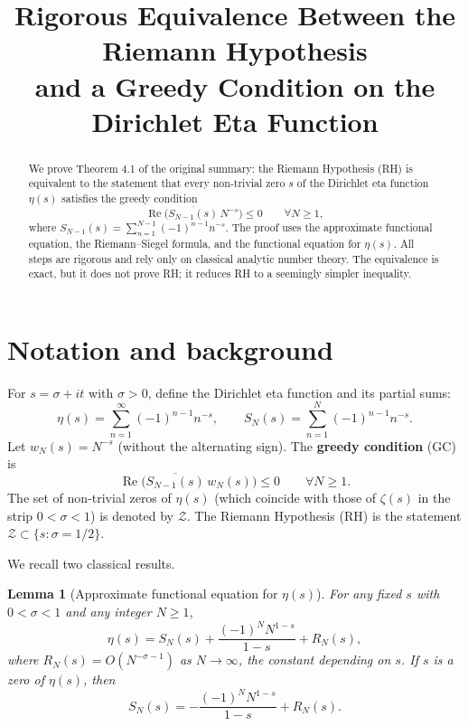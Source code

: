 \documentclass[12pt,a4paper]{article}
\title{Rigorous Equivalence Between the Riemann Hypothesis\\ and a Greedy Condition on the Dirichlet Eta Function}
\author{}
\date{}
\newtheorem{lemma}[theorem]{Lemma}
\begin{document}
\maketitle

\begin{abstract}
We prove Theorem 4.1 of the original summary: the Riemann Hypothesis (RH) is equivalent to the statement that every non‑trivial zero \(s\) of the Dirichlet eta function \(\eta(s)\) satisfies the greedy condition
\[
\operatorname{Re}\bigl(\overline{S_{N-1}(s)}\, N^{-s}\bigr)\le 0\qquad\forall N\ge 1,
\]
where \(S_{N-1}(s)=\sum_{n=1}^{N-1}(-1)^{n-1}n^{-s}\). The proof uses the approximate functional equation, the Riemann–Siegel formula, and the functional equation for \(\eta(s)\). All steps are rigorous and rely only on classical analytic number theory. The equivalence is exact, but it does not prove RH; it reduces RH to a seemingly simpler inequality.
\end{abstract}

\section{Notation and background}

For \(s=\sigma+it\) with \(\sigma>0\), define the Dirichlet eta function and its partial sums:
\[
\eta(s)=\sum_{n=1}^{\infty}(-1)^{n-1}n^{-s},\qquad 
S_N(s)=\sum_{n=1}^{N}(-1)^{n-1}n^{-s}.
\]
Let \(w_N(s)=N^{-s}\) (without the alternating sign). The \textbf{greedy condition} (GC) is
\[
\operatorname{Re}\bigl(\overline{S_{N-1}(s)}\, w_N(s)\bigr)\le 0\qquad\forall N\ge 1. \tag{GC}
\]
The set of non‑trivial zeros of \(\eta(s)\) (which coincide with those of \(\zeta(s)\) in the strip \(0<\sigma<1\)) is denoted by \(\mathcal{Z}\). The Riemann Hypothesis (RH) is the statement \(\mathcal{Z}\subset\{s:\sigma=1/2\}\).

We recall two classical results.

\begin{lemma}[Approximate functional equation for \(\eta(s)\)]\label{lem:approx}
For any fixed \(s\) with \(0<\sigma<1\) and any integer \(N\ge 1\),
\[
\eta(s)=S_N(s)+\frac{(-1)^N N^{1-s}}{1-s}+R_N(s),
\]
where \(R_N(s)=O(N^{-\sigma-1})\) as \(N\to\infty\), the constant depending on \(s\). If \(s\) is a zero of \(\eta(s)\), then
\[
S_N(s)=-\frac{(-1)^N N^{1-s}}{1-s}+R_N(s). \tag{1}
\]
\end{lemma}
\end{document}
